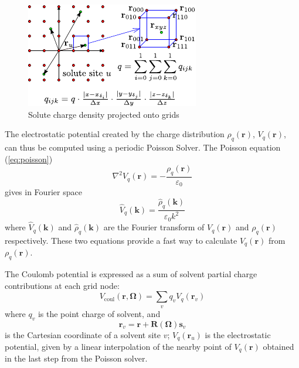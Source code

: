\begin{figure}[h]
\begin{centering}
\includegraphics[scale=1.5]{_figure/charge_int_2}
\par\end{centering}
\caption{Solute charge density projected onto grids\label{fig:Charge-density-projected}}
\end{figure}

The electrostatic potential created by the charge distribution $\rho_{q}(\mathbf{r})$,
$V_{q}(\mathbf{r})$, can thus be computed using a periodic Poisson
Solver. The Poisson equation (\ref{eq:poisson})
\begin{equation}
\nabla^{2}V_{q}(\mathbf{r})=-\frac{\rho_{q}(\mathbf{r})}{\varepsilon_{0}}
\end{equation}
gives in Fourier space
\begin{equation}
\hat{V}_{q}(\mathbf{k})=\frac{\hat{\rho}_{q}(\mathbf{k})}{\varepsilon_{0}k^{2}}
\end{equation}
where $\hat{V}_{q}(\mathbf{k})$ and $\hat{\rho}_{q}(\mathbf{k})$
are the Fourier transform of $V_{q}(\mathbf{r})$ and $\rho_{q}(\mathbf{r})$
respectively. These two equations provide a fast way to calculate
$V_{q}(\mathbf{r})$ from $\rho_{q}(\mathbf{r})$.

The Coulomb potential is expressed as a sum of solvent partial charge
contributions at each grid node:
\begin{equation}
V_{\mathrm{coul}}(\mathbf{r},\mathbf{\Omega})=\sum_{v}q_{v}V_{q}(\mathbf{r}_{v})
\end{equation}
where $q_{v}$ is the point charge of solvent, and
\begin{equation}
\mathbf{r}_{v}=\mathbf{r}+\mathbf{R}(\mathbf{\Omega})\mathbf{s}_{v}
\end{equation}
is the Cartesian coordinate of a solvent site $v$; $V_{q}(\mathbf{r}_{u})$
is the electrostatic potential, given by a linear interpolation of
the nearby point of $V_{q}(\mathbf{r})$ obtained in the last step
from the Poisson solver. 


